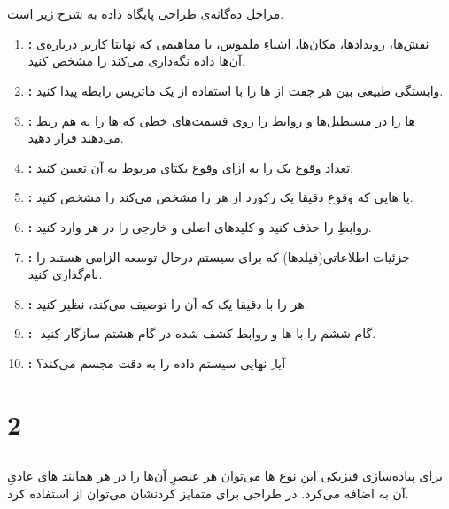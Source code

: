 \documentclass{article}
\begin{document}


\newpage


\section{}
مراحل ده‌گانه‌ی طراحی پایگاه داده به شرح زیر است.
\begin{enumerate}
    \item \textbf{:}
نقش‌ها، رویدادها، مکان‌ها، اشیاءِ ملموس، یا مفاهیمی که نهایتا کاربر درباره‌ی آن‌ها داده نگه‌داری می‌کند را مشخص کنید.
    \item \textbf{:}
وابستگی طبیعی بین هر جفت از ها را با استفاده از یک ماتریس رابطه پیدا کنید.
	\item \textbf{:}
ها را در مستطیل‌ها و روابط را روی قسمت‌های خطی که ها را به هم ربط می‌دهند قرار دهید.
	\item \textbf{:}
تعداد وقوع یک  را به ازای وقوع یکتای  مربوط به آن تعیین کنید.
	\item \textbf{:}
 یا هایی که وقوع دقیقا یک رکورد از هر  را مشخص می‌کند را مشخص کنید.
	\item \textbf{:}
روابطِ  را حذف کنید و کلید‌های اصلی و خارجی را در هر  وارد کنید.
	\item \textbf{:}
جزئیات اطلاعاتی(فیلدها) که برای سیستم درحال توسعه الزامی هستند را نام‌گذاری کنید.
	\item \textbf{:}
هر  را با دقیقا یک  که آن را توصیف می‌کند، نظیر کنید.
	\item \textbf{:}
ِ گام ششم را با ها و روابط کشف شده در گام هشتم سازگار کنید.
	\item \textbf{:}
آیا ِ نهایی سیستم داده را به دقت مجسم می‌کند؟
\end{enumerate}

\section{2}
\subsection{}
برای پیاده‌سازی فیزیکی این نوع ها می‌توان هر عنصرِ آن‌ها را در هر  همانند های عادیِ آن  به  اضافه می‌کرد. در طراحی برای متمایز کردنشان می‌توان از  استفاده کرد.
\end{document}
